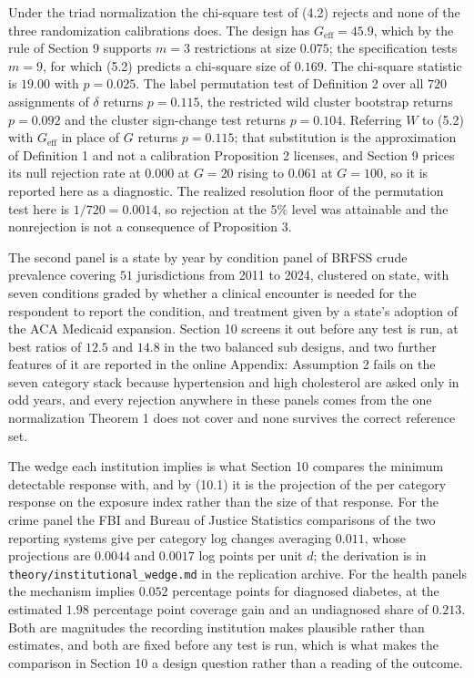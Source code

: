 \documentclass[12pt]{article}
\theoremstyle{definition}
\numberwithin{equation}{section}
\begin{document}
Under the triad normalization the chi-square test of (4.2) rejects and
none of the three randomization calibrations does. The design has
$G_{\mathrm{eff}} = 45.9$, which by the rule of Section 9 supports
$m = 3$ restrictions at size $0.075$; the specification tests $m = 9$, for which
(5.2) predicts a chi-square size of $0.169$. The chi-square statistic is $19.00$ with $p = 0.025$. The label permutation test of Definition
2 over all $720$ assignments of $\delta$ returns $p = 0.115$, the
restricted wild cluster bootstrap returns $p = 0.092$ and the cluster
sign-change test returns $p = 0.104$. Referring $W$ to (5.2) with
$G_{\mathrm{eff}}$ in place of $G$ returns $p = 0.115$; that substitution is the
approximation of Definition 1 and not a calibration Proposition
2 licenses, and Section 9 prices its null rejection
rate at $0.000$ at $G = 20$ rising to $0.061$ at $G = 100$, so it is reported
here as a diagnostic. The realized resolution floor of the permutation test here is $1/720 =
0.0014$, so rejection at the $5\%$ level was attainable and the nonrejection is
not a consequence of Proposition 3.

The second panel is a state by year by condition panel of BRFSS crude prevalence covering $51$ jurisdictions from 2011 to 2024, clustered on state, with seven conditions graded by whether a clinical encounter is needed for the respondent to report the condition, and treatment given by a state's adoption of the ACA Medicaid expansion. Section 10 screens it out before any test is run, at best ratios of $12.5$ and $14.8$ in the two balanced sub designs, and two further features of it are reported in the online Appendix: Assumption 2 fails on the seven category stack because hypertension and high cholesterol are asked only in odd years, and every rejection anywhere in these panels comes from the one normalization Theorem 1 does not cover and none survives the correct reference set.

The wedge each institution implies is what Section 10
compares the minimum detectable response with, and by (10.1) it is the
projection of the per category response on the exposure index rather than the
size of that response. For the crime panel the FBI and Bureau of Justice
Statistics comparisons of the two reporting systems give per category log
changes averaging $0.011$, whose projections are $0.0044$ and $0.0017$ log
points per unit $d$; the derivation is in
\texttt{theory/institutional\_wedge.md} in the replication archive. For the
health panels the mechanism implies
$0.052$ percentage points for diagnosed diabetes, at the estimated $1.98$
percentage point coverage gain and an undiagnosed share of $0.213$. Both are
magnitudes the recording institution makes plausible rather than estimates,
and both are fixed before any test is run, which is what makes the
comparison in Section 10 a design question rather than a
reading of the outcome.
\end{document}

